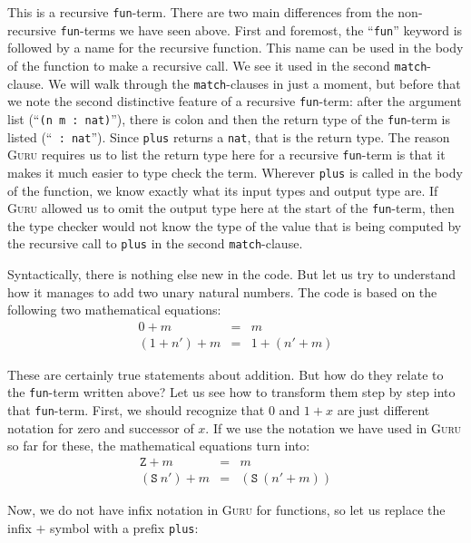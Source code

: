 \documentclass{book}[12pt]
\newcommand{\guru}[0]{\textsc{Guru}\xspace}
\begin{document}
\noindent This is a recursive \texttt{fun}-term.  There are two main
differences from the non-recursive \texttt{fun}-terms we have seen
above.  First and foremost, the ``\texttt{fun}'' keyword is followed
by a name for the recursive function.  This name can be used in the
body of the function to make a recursive call.  We see it used in the
second \texttt{match}-clause.  We will walk through the
\texttt{match}-clauses in just a moment, but before that we note the
second distinctive feature of a recursive \texttt{fun}-term: after the
argument list (``\texttt{(n m : nat)}''), there is colon and then the
return type of the \texttt{fun}-term is listed (``\texttt{ : nat}'').
Since \texttt{plus} returns a \texttt{nat}, that is the return type.
The reason \guru requires us to list the return type here for a
recursive \texttt{fun}-term is that it makes it much easier to type
check the term.  Wherever \texttt{plus} is called in the body of the
function, we know exactly what its input types and output type are.
If \guru allowed us to omit the output type here at the start of the
\texttt{fun}-term, then the type checker would not know the type of
the value that is being computed by the recursive call to
\texttt{plus} in the second \texttt{match}-clause.

Syntactically, there is nothing else new in the code.  But let us try
to understand how it manages to add two unary natural numbers.  The
code is based on the following two mathematical equations:
\begin{eqnarray}
\label{ch2:eq1}
0+ m & = & m \\
(1+n')+m & = & 1+(n'+m)
\end{eqnarray}

\noindent These are certainly true statements about addition.  But
how do they relate to the \texttt{fun}-term written above?  Let us
see how to transform them step by step into that \texttt{fun}-term.
First, we should recognize that $0$ and $1+x$ are just different
notation for zero and successor of $x$.  If we use the notation we
have used in \guru so far for these, the mathematical equations
turn into:
\begin{eqnarray*}
\texttt{Z}+ m & = & m \\
(\texttt{S}\ n')+m & = & (\texttt{S}\ (n'+m))
\end{eqnarray*}

\noindent Now, we do not have infix notation in \guru for functions,
so let us replace the infix $+$ symbol with a prefix \texttt{plus}:
\end{document}
